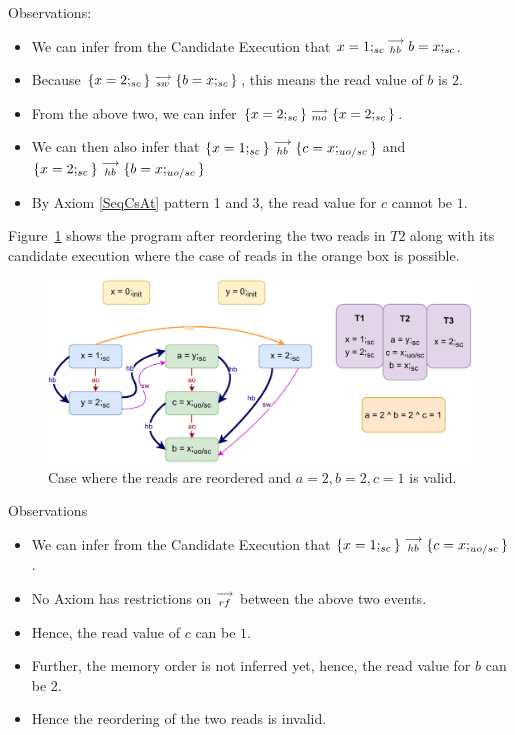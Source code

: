         Observations:
        \begin{itemize}
            \item We can infer from the Candidate Execution that $x=1;_{sc}\stackrel{\longrightarrow}{_{hb}}b=x;_{sc}$.
            \item Because $\{x=2;_{sc}\}\stackrel{\longrightarrow}{_{sw}}\{b=x;_{sc}\}$, this means the read value of $b$ is $2$.
            \item From the above two, we can infer $\{x=2;_{sc}\}\stackrel{\longrightarrow}{_{mo}}\{x=2;_{sc}\}$.
            \item We can then also infer that $\{x=1;_{sc}\}\stackrel{\longrightarrow}{_{hb}}\{c=x;_{uo/sc}\}$ and $\{x=2;_{sc}\}\stackrel{\longrightarrow}{_{hb}}\{b=x;_{uo/sc}\}$
            \item By Axiom \ref{SeqCsAt} pattern 1 and 3, the read value for $c$ cannot be $1$.
        \end{itemize}

        Figure~\ref{reord_counter:example1(b)} shows the program after reordering the two reads in $T2$ along with its candidate execution where the case of reads in the orange box is possible. 
        \begin{figure}[H]
            \centering
            \includegraphics[scale=0.7]{5.InstructionReordering/4.ValidReorderingCandidate/Example0R(Rsc-Ruo,sc).pdf}
            \caption{Case where the reads are reordered and $a = 2 , b = 2, c = 1$ is valid.}
            \label{reord_counter:example1(b)}
        \end{figure}

        Observations
        \begin{itemize}
            \item We can infer from the Candidate Execution that $\{x=1;_{sc}\}\stackrel{\longrightarrow}{_{hb}}\{c=x;_{uo/sc}\}$.
            \item No Axiom has restrictions on $\stackrel{\longrightarrow}{_{rf}}$ between the above two events.
            \item Hence, the read value of $c$ can be $1$.
            \item Further, the memory order is not inferred yet\footnotemark, hence, the read value for $b$ can be $2$.
            \item Hence the reordering of the two reads is invalid. 
        \end{itemize}

